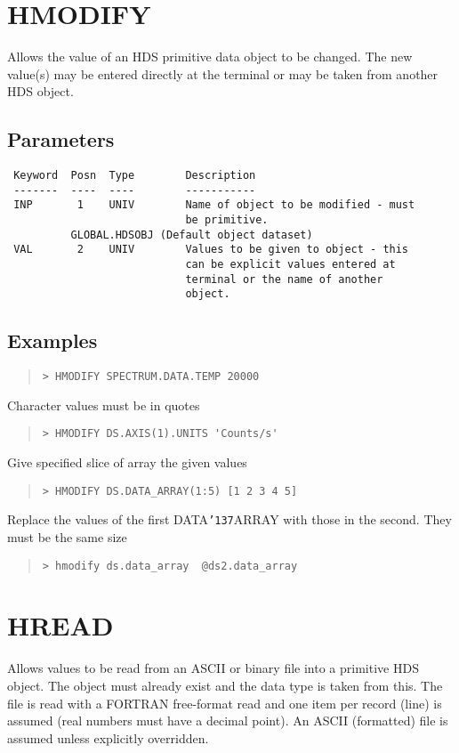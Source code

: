 \documentclass{book}
\renewcommand{\_}{{\tt\char'137}}     %
\begin{document}
\section{HMODIFY}
Allows the value of an HDS primitive data object to be changed.
The new value(s) may be entered directly at the terminal or may
be taken from another HDS object.

\subsection{Parameters}
\begin{verbatim}
 Keyword  Posn  Type        Description
 -------  ----  ----        -----------
 INP       1    UNIV        Name of object to be modified - must
                            be primitive.
          GLOBAL.HDSOBJ (Default object dataset)
 VAL       2    UNIV        Values to be given to object - this
                            can be explicit values entered at
                            terminal or the name of another
                            object.

\end{verbatim}\subsection{Examples}
\begin{quote}\begin{verbatim}
> HMODIFY SPECTRUM.DATA.TEMP 20000
\end{verbatim}\end{quote}
Character values must be in quotes
\begin{quote}\begin{verbatim}
> HMODIFY DS.AXIS(1).UNITS 'Counts/s'
\end{verbatim}\end{quote}
Give specified slice of array the given values
\begin{quote}\begin{verbatim}
> HMODIFY DS.DATA_ARRAY(1:5) [1 2 3 4 5]
\end{verbatim}\end{quote}
Replace the values of the first DATA\_ARRAY with those in the second.
They must be the same size
\begin{quote}\begin{verbatim}
> hmodify ds.data_array  @ds2.data_array
\end{verbatim}\end{quote}
\section{HREAD}
Allows values to be read from an ASCII or binary file into a
primitive HDS object. The object must already exist and the data
type is taken from this. The file is read with a FORTRAN
free-format read and one item per record (line) is assumed (real
numbers must have a decimal point). An ASCII (formatted) file is
assumed unless explicitly overridden.
\end{document}
